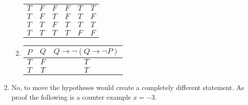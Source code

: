 \begin{enumerate}
\begin{enumerate}
\begin{tabular}{c|c|c|c|c|c}
        $T$ & $F$ & $F$ & $F$ & $T$ & $T$ \\
        $T$ & $F$ & $T$ & $F$ & $T$ & $F$ \\
        $T$ & $T$ & $F$ & $T$ & $T$ & $T$ \\
        $T$ & $T$ & $T$ & $T$ & $F$ & $F$ \\
        \end{tabular}
        \item 
        \begin{tabular}{c|c|c}
            $P$ & $Q$ & $Q \rightarrow \lnot (Q \rightarrow \lnot P)$ \\ \hline
            $T$ & $F$ & $T$ \\
            $T$ & $T$ & $T$ \\
        \end{tabular}
    \end{enumerate}
    \item 
    No, to move the hypotheses would create a completely different statement. As proof the following is a counter example $x = -3$.
\end{enumerate}
